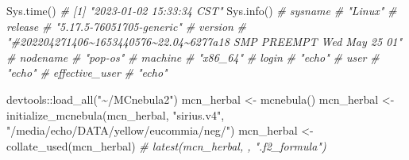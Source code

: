 \documentclass[
]{article}
\newenvironment{Shaded}{\begin{snugshade}}{\end{snugshade}}
\newcommand{\CommentTok}[1]{\textcolor[rgb]{0.56,0.35,0.01}{\textit{#1}}}
\newcommand{\FunctionTok}[1]{\textcolor[rgb]{0.00,0.00,0.00}{#1}}
\newcommand{\NormalTok}[1]{#1}
\newcommand{\OtherTok}[1]{\textcolor[rgb]{0.56,0.35,0.01}{#1}}
\newcommand{\SpecialCharTok}[1]{\textcolor[rgb]{0.00,0.00,0.00}{#1}}
\newcommand{\StringTok}[1]{\textcolor[rgb]{0.31,0.60,0.02}{#1}}
\begin{document}
\begin{Shaded}
\begin{Highlighting}[]
\FunctionTok{Sys.time}\NormalTok{()}
\CommentTok{\# [1] "2023{-}01{-}02 15:33:34 CST"}
\FunctionTok{Sys.info}\NormalTok{()}
\CommentTok{\#                                                            sysname }
\CommentTok{\#                                                            "Linux" }
\CommentTok{\#                                                            release }
\CommentTok{\#                                          "5.17.5{-}76051705{-}generic" }
\CommentTok{\#                                                            version }
\CommentTok{\# "\#202204271406\textasciitilde{}1653440576\textasciitilde{}22.04\textasciitilde{}6277a18 SMP PREEMPT Wed May 25 01" }
\CommentTok{\#                                                           nodename }
\CommentTok{\#                                                           "pop{-}os" }
\CommentTok{\#                                                            machine }
\CommentTok{\#                                                           "x86\_64" }
\CommentTok{\#                                                              login }
\CommentTok{\#                                                             "echo" }
\CommentTok{\#                                                               user }
\CommentTok{\#                                                             "echo" }
\CommentTok{\#                                                     effective\_user }
\CommentTok{\#                                                             "echo" }

\NormalTok{devtools}\SpecialCharTok{::}\FunctionTok{load\_all}\NormalTok{(}\StringTok{"\textasciitilde{}/MCnebula2"}\NormalTok{)}
\NormalTok{mcn\_herbal }\OtherTok{\textless{}{-}} \FunctionTok{mcnebula}\NormalTok{()}
\NormalTok{mcn\_herbal }\OtherTok{\textless{}{-}} \FunctionTok{initialize\_mcnebula}\NormalTok{(mcn\_herbal, }\StringTok{"sirius.v4"}\NormalTok{, }\StringTok{"/media/echo/DATA/yellow/eucommia/neg/"}\NormalTok{)}
\NormalTok{mcn\_herbal }\OtherTok{\textless{}{-}} \FunctionTok{collate\_used}\NormalTok{(mcn\_herbal)}
\CommentTok{\# latest(mcn\_herbal, , ".f2\_formula")}


\end{Highlighting}
\end{Shaded}
\end{document}

